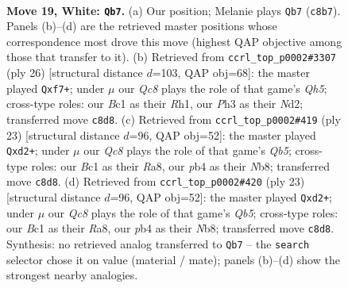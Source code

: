 \documentclass[11pt]{article}
\begin{document}
\clearpage

\begin{figure}[p]\centering
\begin{subfigure}{0.46\textwidth}\centering
\resizebox{\linewidth}{!}{%
\newchessgame
\chessboard[
  setfen={rnQqkbnr/6p1/2p5/p2p2P1/1p1P2Bp/7P/PPP2P2/R1BN1RK1 w - - 2 19},
  showmover=false,
  pgfstyle=straightmove, color=movearrow, markmove={c8-b7}
]}
\caption{}
\end{subfigure}\hfill
\begin{subfigure}{0.46\textwidth}\centering
\resizebox{\linewidth}{!}{%
\newchessgame
\chessboard[
  setfen={r1b1k2r/2pn1qpp/p1p2p2/4p2Q/4P3/2P1B3/P1PN1PPP/R3K2R w KQkq - 3 14},
  showmover=false,
  pgfstyle=straightmove, color=movearrow, markmove={h5-f7}
]}
\caption{}
\end{subfigure}
\\[4pt]
\begin{subfigure}{0.46\textwidth}\centering
\resizebox{\linewidth}{!}{%
\newchessgame
\chessboard[
  setfen={rnb2rk1/pp1p1pp1/7p/3P4/1q2p3/6PN/PP1QPPBP/R3K2R b KQ - 1 12},
  showmover=false,
  pgfstyle=straightmove, color=movearrow, markmove={b4-d2}
]}
\caption{}
\end{subfigure}\hfill
\begin{subfigure}{0.46\textwidth}\centering
\resizebox{\linewidth}{!}{%
\newchessgame
\chessboard[
  setfen={rnb2rk1/pp1p1pp1/7p/3P4/1q2p3/6PN/PP1QPPBP/R3K2R b KQ - 1 12},
  showmover=false,
  pgfstyle=straightmove, color=movearrow, markmove={b4-d2}
]}
\caption{}
\end{subfigure}
\caption{\textbf{Move 19, White: \texttt{Qb7}.} (a) Our position; Melanie plays \texttt{Qb7} (\texttt{c8b7}). Panels (b)--(d) are the retrieved master positions whose correspondence most drove this move (highest QAP objective among those that transfer to it). (b) Retrieved from \texttt{ccrl\_top\_p0002\#3307} (ply 26) [structural distance $d$=103, QAP obj=68]: the master played \texttt{Qxf7+}; under $\mu$ our \emph{Qc8} plays the role of that game's \emph{Qh5}; cross-type roles: our \emph{B}c1 as their \emph{R}h1, our \emph{P}h3 as their \emph{N}d2; transferred move \texttt{c8d8}. (c) Retrieved from \texttt{ccrl\_top\_p0002\#419} (ply 23) [structural distance $d$=96, QAP obj=52]: the master played \texttt{Qxd2+}; under $\mu$ our \emph{Qc8} plays the role of that game's \emph{Qb5}; cross-type roles: our \emph{B}c1 as their \emph{R}a8, our \emph{p}b4 as their \emph{N}b8; transferred move \texttt{c8d8}. (d) Retrieved from \texttt{ccrl\_top\_p0002\#420} (ply 23) [structural distance $d$=96, QAP obj=52]: the master played \texttt{Qxd2+}; under $\mu$ our \emph{Qc8} plays the role of that game's \emph{Qb5}; cross-type roles: our \emph{B}c1 as their \emph{R}a8, our \emph{p}b4 as their \emph{N}b8; transferred move \texttt{c8d8}. Synthesis: no retrieved analog transferred to \texttt{Qb7} -- the \texttt{search} selector chose it on value (material / mate); panels (b)--(d) show the strongest nearby analogies.}
\label{fig:thought-m36}
\end{figure}
\end{document}
